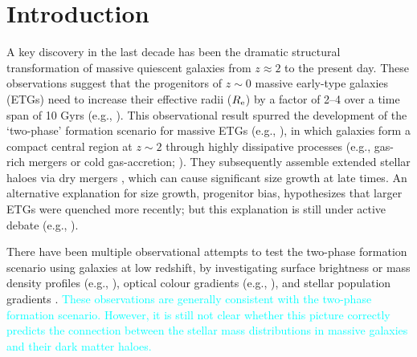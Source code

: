\documentclass[a4paper,fleqn,usenatbib]{mnras}
\newcommand{\song}[1]{\textcolor{cyan}{#1}}
\begin{document}



\section{Introduction}
    \label{sec:intro}
    
    A key discovery in the last decade has been the dramatic structural transformation 
    of massive quiescent galaxies \citep[e.g.,][]{Trujillo2006, vanDokkum2008, 
    Cimatti2008, Damjanov2009, vanderWel2011, Szomoru2012, Patel2013} from 
    $z \approx 2$ to the present day. 
    These observations suggest that the progenitors of $z{\sim} 0$ massive early-type 
    galaxies (ETGs) need to increase their effective radii ($R_{\rm e}$) by a factor 
    of 2--4 over a time span of 10 Gyrs (e.g., \citealt{Newman2012, vdWel2014}). 
    This observational result spurred the development of the `two-phase' formation
    scenario for massive ETGs (e.g., \citealt{Oser2010, Oser2012}),
    in which galaxies form a compact central region at $z\sim 2$ through highly 
    dissipative processes (e.g., gas-rich mergers or cold gas-accretion;
    \citealt{Hopkins2008, Dekel2009}). 
    They subsequently assemble extended stellar haloes via dry mergers 
    \citep[e.g.,][]{Naab2006, Khochfar2006, Oser2010, Oser2012}, which can cause 
    significant size growth at late times. 
    An alternative explanation for size growth, progenitor bias, hypothesizes that 
    larger ETGs were quenched more recently; but this explanation is still under 
    active debate (e.g., \citealt{Newman2012, Carollo2013, Poggianti2013, Belli2015,
    Keating2015, Fagioli2016}). 
    
    There have been multiple observational attempts to test the two-phase 
    formation scenario using galaxies at low redshift, by investigating surface 
    brightness or mass density profiles (e.g., \citealt{Huang2013a, Huang2013b, 
    Oh2017}), optical colour gradients (e.g., \citealt{LaBarbera2010, LaBarbera2012}), 
    and stellar population gradients \citep[e.g.,][]{Coccato2010, Coccato2011, 
    Greene2015, Barbosa2016}. 
    \song{
    These observations are generally consistent with the two-phase formation scenario. 
    However, it is still not clear whether this picture correctly 
    predicts the connection between the stellar mass distributions in massive galaxies 
    and their dark matter haloes.}
    
\end{document}
